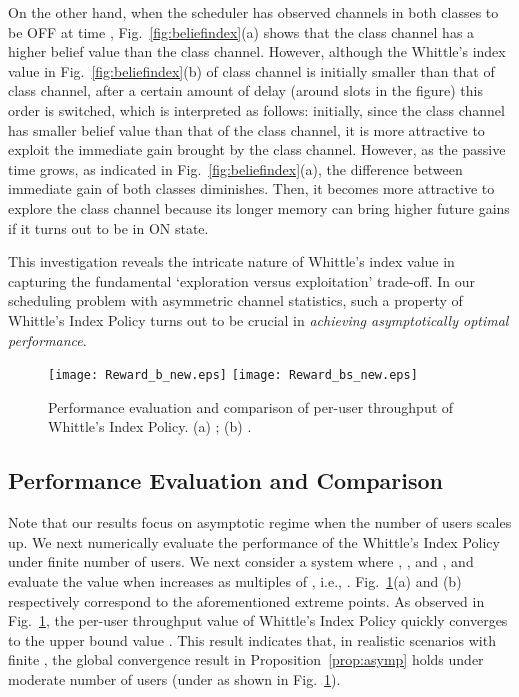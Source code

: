 \documentclass[11pt,twocolumn]{IEEEtran}
\begin{document}
On the other hand, when the scheduler has observed channels in both
classes to be OFF at time , Fig.~\ref{fig:beliefindex}(a) shows
that the class  channel has a higher belief value than the class
 channel. However, although the Whittle's index value in
Fig.~\ref{fig:beliefindex}(b) of class  channel is initially
smaller than that of class  channel, after a certain amount of
delay (around  slots in the figure) this order is switched, which
is interpreted as follows: initially, since the class 
channel has smaller belief value than that of the class  channel,
it is more attractive to exploit the immediate gain brought by the
class  channel. However, as the passive time grows, as indicated
in Fig.~\ref{fig:beliefindex}(a), the difference between immediate
gain of both classes diminishes. Then, it becomes more attractive to
explore the class  channel because its longer memory can
bring higher future gains if it turns out to be in ON state.

This investigation reveals the intricate nature of Whittle's index
value in capturing the fundamental `exploration versus exploitation'
trade-off. In our scheduling problem with asymmetric channel
statistics, such a property of Whittle's Index Policy turns out to
be crucial in \emph{achieving asymptotically optimal performance}.

\begin{figure}
\centering
\texttt{[image: Reward\_b\_new.eps]}
\texttt{[image: Reward\_bs\_new.eps]}
\vspace{-3pt} \caption{Performance evaluation and comparison of per-user throughput of Whittle's Index Policy. (a) ; (b) .}
\vspace{-15pt}
\label{fig:realistic}
\end{figure}

\subsection{Performance Evaluation and Comparison}

Note that our results focus on asymptotic regime when the number of users scales up. We next numerically evaluate the performance of the Whittle's Index Policy under finite number of users. We next consider a system where , ,  and , and evaluate the value  when  increases as multiples of , i.e., . Fig.~\ref{fig:realistic}(a) and (b) respectively correspond to the aforementioned extreme points. As observed in Fig.~\ref{fig:realistic}, the per-user throughput value  of Whittle's Index Policy quickly converges to the upper bound value . This result indicates that, in realistic scenarios with finite , the global convergence result in Proposition~\ref{prop:asymp} holds under moderate number of users (under  as shown in Fig.~\ref{fig:realistic}). 
\end{document}
